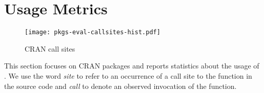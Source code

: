 \documentclass[review,screen,acmsmall]{acmart}
\begin{document}
\section{Usage Metrics}

\begin{wrapfigure}{r}{5cm} \vspace{-1cm} \hspace*{-12mm}
  \centering
  \texttt{[image: pkgs-eval-callsites-hist.pdf]}
  \caption{CRAN \eval call sites}%
  \label{fig:pkgs-eval-callsites-hist}\vspace{-3mm}
\end{wrapfigure}
%
This section focuses on CRAN packages and reports statistics about the usage of
\eval. We use the word \emph{site} to refer to an occurrence of a call site to the \eval
function in the source code and \emph{call} to denote an observed invocation of
the \eval function.
\end{document}
